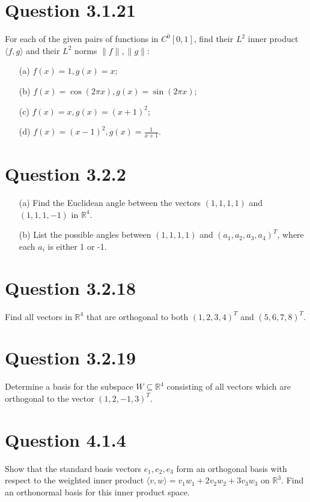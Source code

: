 \documentclass[12pt]{article}
\begin{document}
\section*{Question 3.1.21}
For each of the given pairs of functions in \( C^0[0, 1] \), find their \( L^2 \) inner product \( \langle f, g \rangle \) and their \( L^2 \) norms \( \|f\|, \|g\| \):
\begin{itemize}
    \item[(a)] \( f(x) = 1, g(x) = x \);
    \item[(b)] \( f(x) = \cos(2\pi x), g(x) = \sin(2\pi x) \);
    \item[(c)] \( f(x) = x, g(x) = (x + 1)^2 \);
    \item[(d)] \( f(x) = (x - 1)^2, g(x) = \frac{1}{x + 1} \).
\end{itemize}

\section*{Question 3.2.2}
\begin{itemize}
    \item[(a)] Find the Euclidean angle between the vectors \( (1, 1, 1, 1) \) and \( (1, 1, 1, -1) \) in \( \mathbb{R}^4 \).
    \item[(b)] List the possible angles between \( (1, 1, 1, 1) \) and \( (a_1, a_2, a_3, a_4)^T \), where each \( a_i \) is either 1 or -1.
\end{itemize}

\section*{Question 3.2.18}
Find all vectors in \( \mathbb{R}^4 \) that are orthogonal to both \( (1, 2, 3, 4)^T \) and \( (5, 6, 7, 8)^T \).

\section*{Question 3.2.19}
Determine a basis for the subspace \( W \subseteq \mathbb{R}^4 \) consisting of all vectors which are orthogonal to the vector \( (1, 2, -1, 3)^T \).





\section*{Question 4.1.4}
Show that the standard basis vectors \( e_1, e_2, e_3 \) form an orthogonal basis with respect to the weighted inner product \( \langle v, w \rangle = v_1 w_1 + 2v_2 w_2 + 3v_3 w_3 \) on \( \mathbb{R}^3 \). Find an orthonormal basis for this inner product space.
\end{document}
